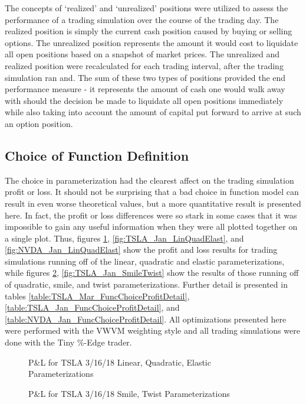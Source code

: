 \documentclass[12pt, a4paper, notitlepage]{article}
\numberwithin{equation}{subsection}
\numberwithin{figure}{subsection}
\numberwithin{table}{subsection}
\newcommand{\img}[3]
{
    \begin{figure}[H]
	\caption{#1}
	\centerline{\fbox{\texttt{[image: \#2]}}}
	\label{#3}
    \end{figure}
}
\newcommand{\newpar}{\newline \newline}
\begin{document}
\newpar
The concepts of `realized' and `unrealized' positions were utilized to assess the performance of a trading simulation over the course of the trading day.  The realized position is simply the current cash position caused by buying or selling options.  The unrealized position represents the amount it would cost to liquidate all open positions based on a snapshot of market prices.  The unrealized and realized position were recalculated for each trading interval, after the trading simulation ran and.  The sum of these two types of positions provided the end performance measure - it represents the amount of cash one would walk away with should the decision be made to liquidate all open positions immediately while also taking into account the amount of capital put forward to arrive at such an option position.

\subsection{Choice of Function Definition}\label{subsec:ResultsChoiceOfFunc}
The choice in parameterization had the clearest affect on the trading simulation profit or loss.  It should not be surprising that a bad choice in function model can result in even worse theoretical values, but a more quantitative result is presented here.  In fact, the profit or loss differences were so stark in some cases that it was impossible to gain any useful information when they were all plotted together on a single plot.  Thus, figures \ref{fig:TSLA_Mar_LinQuadElast}, \ref{fig:TSLA_Jan_LinQuadElast}, and \ref{fig:NVDA_Jan_LinQuadElast} show the profit and loss results for trading simulations running off of the linear, quadratic and elastic parameterizations, while figures \ref{fig:TSLA_Mar_SmileTwist}, \ref{fig:TSLA_Jan_SmileTwist} show the results of those running off of quadratic, smile, and twist parameterizations.  Further detail is presented in tables \ref{table:TSLA_Mar_FuncChoiceProfitDetail}, \ref{table:TSLA_Jan_FuncChoiceProfitDetail}, and \ref{table:NVDA_Jan_FuncChoiceProfitDetail}.  All optimizations presented here were performed with the VWVM weighting style and all trading simulations were done with the Tiny \%-Edge trader.

\img{P\&L for TSLA 3/16/18 Linear, Quadratic, Elastic Parameterizations}{TSLA_Mar_LinQuadElast}{fig:TSLA_Mar_LinQuadElast}

\img{P\&L for TSLA 3/16/18 Smile, Twist Parameterizations}{TSLA_Mar_SmileTwist}{fig:TSLA_Mar_SmileTwist}
\end{document}
